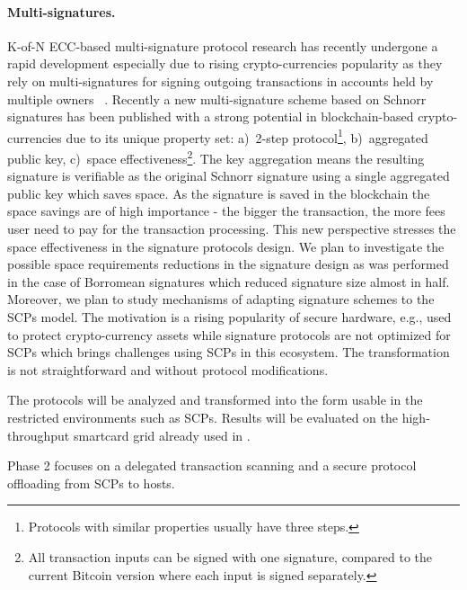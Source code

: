 \documentclass[
  digital, %
  twoside, %
  table,   %
  lof,     %
  lot,     %
]{fithesis3}
\theoremstyle{definition}
\theoremstyle{remark}
\begin{document}
\begin{ecmmnt}
\paragraph{Multi-signatures.} K-of-N ECC-based multi-signature protocol research has recently undergone a rapid development especially due to rising crypto-currencies popularity as they rely on multi-signatures for signing outgoing transactions in accounts held by multiple owners ~\cite{Bellare:2006:MPP:1180405.1180453, Bellare:2007:UAS:2394539.2394589, 10.1007/3-540-36288-6_3, cryptoeprint:2015:996, Bnz2017BulletproofsSP, cryptoeprint:2018:068}.
Recently a new multi-signature scheme \cite{cryptoeprint:2018:068} based on Schnorr signatures \cite{schnor-10.1007/3-540-46885-4_68} has been published with a strong potential in blockchain-based crypto-currencies due to its unique property set: 
a)~2-step protocol\footnote{Protocols with similar properties usually have three steps.}, b)~aggregated public key, c)~space effectiveness\footnote{All transaction inputs can be signed with one signature, compared to the current Bitcoin version where each input is signed separately.}. 
The key aggregation means the resulting signature is verifiable as the original Schnorr signature using a single aggregated public key which saves space. As the signature is saved in the blockchain the space savings are of high importance - the bigger the transaction, the more fees user need to pay for the transaction processing. This new perspective stresses the space effectiveness in the signature protocols design. We plan to investigate the possible space requirements reductions in the signature design as was performed in the case of Borromean signatures \cite{borromean} which reduced signature size almost in half. Moreover, we plan to study mechanisms of adapting signature schemes to the SCPs model. The motivation is a rising popularity of secure hardware, e.g., used to protect crypto-currency assets while signature protocols are not optimized for SCPs which brings challenges using SCPs in this ecosystem. The transformation is not straightforward and without protocol modifications.


The protocols will be analyzed and transformed into the form usable in the restricted environments such as SCPs. Results will be evaluated on the high-throughput smartcard grid already used in \cite{2017-ccs-mavroudis}. 


Phase 2 focuses on a delegated transaction scanning and a secure protocol offloading from SCPs to hosts.
 

\end{ecmmnt}
\end{document}
